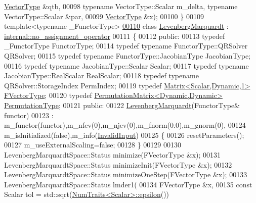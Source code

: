 \begin{DoxyCode}
      \hyperlink{struct_vector_type}{VectorType}  &qtb,
00098         \textcolor{keyword}{typename} VectorType::Scalar m\_delta, \textcolor{keyword}{typename} VectorType::Scalar &par,
00099         \hyperlink{struct_vector_type}{VectorType}  &x);
00100     \}
00109 \textcolor{keyword}{template}<\textcolor{keyword}{typename} \_FunctorType>
\hyperlink{class_eigen_1_1_levenberg_marquardt}{00110} \textcolor{keyword}{class }\hyperlink{class_eigen_1_1_levenberg_marquardt}{LevenbergMarquardt} : \hyperlink{class_eigen_1_1internal_1_1no__assignment__operator}{internal::no\_assignment\_operator}
00111 \{
00112   \textcolor{keyword}{public}:
00113     \textcolor{keyword}{typedef} \_FunctorType FunctorType;
00114     \textcolor{keyword}{typedef} \textcolor{keyword}{typename} FunctorType::QRSolver QRSolver;
00115     \textcolor{keyword}{typedef} \textcolor{keyword}{typename} FunctorType::JacobianType JacobianType;
00116     \textcolor{keyword}{typedef} \textcolor{keyword}{typename} JacobianType::Scalar Scalar;
00117     \textcolor{keyword}{typedef} \textcolor{keyword}{typename} JacobianType::RealScalar RealScalar; 
00118     \textcolor{keyword}{typedef} \textcolor{keyword}{typename} QRSolver::StorageIndex PermIndex;
00119     \textcolor{keyword}{typedef} \hyperlink{group___core___module}{Matrix<Scalar,Dynamic,1>} \hyperlink{group___core___module}{FVectorType};
00120     \textcolor{keyword}{typedef} \hyperlink{group___core___module}{PermutationMatrix<Dynamic,Dynamic>} 
      \hyperlink{group___core___module}{PermutationType};
00121   \textcolor{keyword}{public}:
00122     \hyperlink{class_eigen_1_1_levenberg_marquardt}{LevenbergMarquardt}(FunctorType& functor) 
00123     : m\_functor(functor),m\_nfev(0),m\_njev(0),m\_fnorm(0.0),m\_gnorm(0),
00124       m\_isInitialized(\textcolor{keyword}{false}),m\_info(\hyperlink{group__enums_gga85fad7b87587764e5cf6b513a9e0ee5ea945604f62795ffc70aedf2bd12ea0434}{InvalidInput})
00125     \{
00126       resetParameters();
00127       m\_useExternalScaling=\textcolor{keyword}{false}; 
00128     \}
00129     
00130     LevenbergMarquardtSpace::Status minimize(FVectorType &x);
00131     LevenbergMarquardtSpace::Status minimizeInit(FVectorType &x);
00132     LevenbergMarquardtSpace::Status minimizeOneStep(FVectorType &x);
00133     LevenbergMarquardtSpace::Status lmder1(
00134       FVectorType  &x, 
00135       \textcolor{keyword}{const} Scalar tol = std::sqrt(\hyperlink{group___core___module_struct_eigen_1_1_num_traits}{NumTraits<Scalar>::epsilon}())

\end{DoxyCode}
